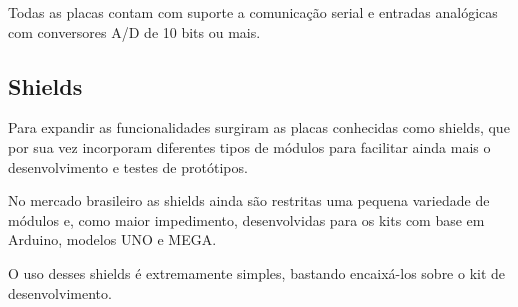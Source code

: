 \begin{table}[h!]
\centering
{}
\caption{Principais placas de desenvolvimento}
\label{tab:placas}
\end{table}

Todas as placas contam com suporte a comunicação serial e entradas analógicas com conversores A/D de 10 bits ou mais.

\subsection{Shields}

Para expandir as funcionalidades surgiram as placas conhecidas como shields, que por sua vez incorporam diferentes tipos de módulos para facilitar ainda mais o desenvolvimento e testes de protótipos.

No mercado brasileiro as shields ainda são restritas uma pequena variedade de módulos e, como maior impedimento, desenvolvidas para os kits com base em Arduino, modelos UNO e MEGA.

O uso desses shields é extremamente simples, bastando encaixá-los sobre o kit de desenvolvimento.

